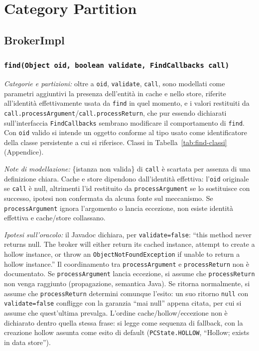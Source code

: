 \section{Category Partition}
\label{sec:cp}

\subsection{BrokerImpl}

\subsubsection{\texttt{find(Object oid, boolean validate, FindCallbacks call)}}

\textit{Categorie e partizioni:} oltre a \texttt{oid}, \texttt{validate}, \texttt{call}, sono
modellati come parametri aggiuntivi la presenza dell'entità in cache e nello store, riferite
all'identità effettivamente usata da \texttt{find} in quel momento, e i valori restituiti da
\texttt{call.processArgument}/\texttt{call.processReturn}, che pur essendo dichiarati
sull'interfaccia \texttt{FindCallbacks} sembrano modificare il comportamento di \texttt{find}.
Con \texttt{oid} valido si intende un oggetto conforme al tipo usato come identificatore della
classe persistente a cui si riferisce. Classi in Tabella~\ref{tab:find-classi} (Appendice).

\textit{Note di modellazione:} \{istanza non valida\} di \texttt{call} è scartata per assenza di
una definizione chiara. Cache e store dipendono dall'identità effettiva: l'\texttt{oid}
originale se \texttt{call} è null, altrimenti l'id restituito da \texttt{processArgument} se lo
sostituisce con successo, ipotesi non confermata da alcuna fonte sul meccanismo. Se
\texttt{processArgument} ignora l'argomento o lancia eccezione, non esiste identità effettiva e
cache/store collassano.

\textit{Ipotesi sull'oracolo:} il Javadoc dichiara, per \texttt{validate=false}: ``this method
never returns null. The broker will either return its cached instance, attempt to create a
hollow instance, or throw an \texttt{ObjectNotFoundException} if unable to return a hollow
instance.'' Il coordinamento tra \texttt{processArgument} e \texttt{processReturn} non è
documentato. Se \texttt{processArgument} lancia eccezione, si assume che \texttt{processReturn}
non venga raggiunto (propagazione, semantica Java). Se ritorna normalmente, si assume che
\texttt{processReturn} determini comunque l'esito: un suo ritorno \texttt{null} con
\texttt{validate=false} confligge con la garanzia ``mai null'' appena citata, per cui si assume
che quest'ultima prevalga. L'ordine cache/hollow/eccezione non è dichiarato dentro quella stessa
frase: si legge come sequenza di fallback, con la creazione hollow assunta come esito di default
(\texttt{PCState.HOLLOW}, ``Hollow; exists in data store'').

